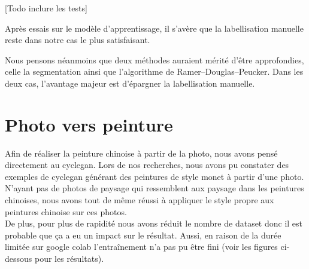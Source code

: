\documentclass[a4paper, 12pt]{report}
\begin{document}
[Todo inclure les tests]

Après essais sur le modèle d'apprentissage, il s'avère que la labellisation manuelle reste dans notre cas le plus satisfaisant.

Nous pensons néanmoins que deux méthodes auraient mérité d'être approfondies, celle la segmentation ainsi que l’algorithme de Ramer–Douglas–Peucker. Dans les deux cas, l'avantage majeur est d'épargner la labellisation manuelle.


\section{Photo vers peinture}
Afin de réaliser la peinture chinoise à partir de la photo, nous avons pensé directement au cyclegan. Lors de nos recherches, nous avons pu constater des exemples de cyclegan générant des peintures de style monet à partir d'une photo. \\
N'ayant pas de photos de paysage qui ressemblent aux paysage dans les peintures chinoises, nous avons tout de même réussi à appliquer le style propre aux peintures chinoise sur ces photos.\\
De plus, pour plus de rapidité nous avons réduit le nombre de dataset donc il est probable que ça a eu un impact sur le résultat. Aussi, en raison de la durée limitée sur google colab l'entraînement n'a pas pu être fini (voir les figures ci-dessous pour les résultats). 
\end{document}
